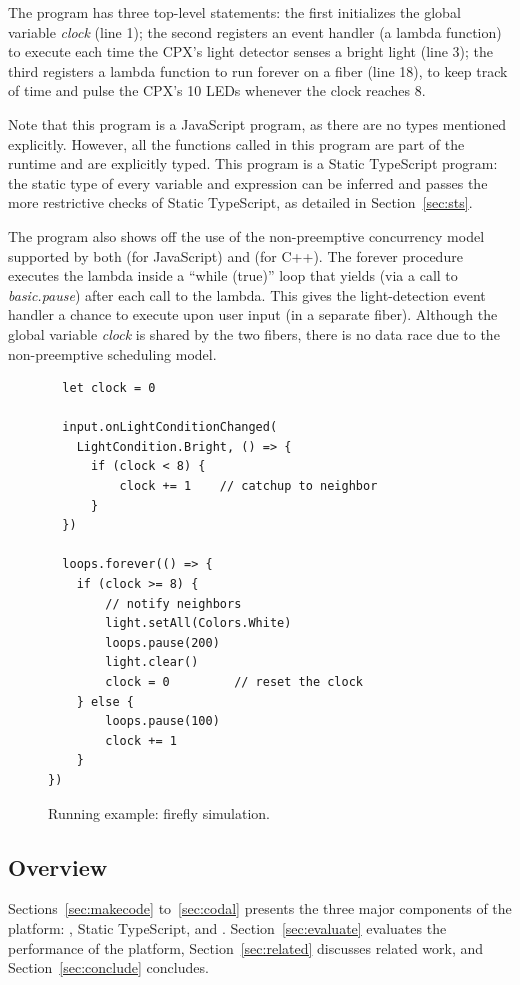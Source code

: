 The program has three top-level statements:
the first initializes the global variable \emph{clock} (line 1); the
second registers an event handler (a lambda function) to execute
each time the CPX's light detector senses a bright light (line 3); the
third registers a lambda function to run forever on a fiber (line 18),
to keep track of time and pulse the CPX's 10 LEDs whenever the
clock reaches 8.

Note that this program is a JavaScript program, as there are no
types mentioned explicitly. However, all the functions called in
this program are part of the runtime and are explicitly
typed. This program is a Static TypeScript program:
the static type of every variable and expression
can be inferred and passes the more restrictive checks
of Static TypeScript, as detailed in Section~\ref{sec:sts}.

The program also shows off the use of the non-preemptive concurrency
model supported by both \MC (for JavaScript) and \CO (for C++).
The forever procedure executes the lambda inside a ``while (true)''
loop that yields (via a call to \emph{basic.pause}) after each call to the lambda.
This gives the light-detection event handler a chance to execute
upon user input (in a separate fiber). Although the global variable \emph{clock} is
shared by the two fibers, there is no data race due to the non-preemptive
scheduling model.

\begin{figure}
\begin{lstlisting}
  let clock = 0

  input.onLightConditionChanged(
    LightCondition.Bright, () => {
      if (clock < 8) {
          clock += 1    // catchup to neighbor
      }
  })

  loops.forever(() => {
    if (clock >= 8) {
        // notify neighbors
        light.setAll(Colors.White)
        loops.pause(200)
        light.clear()
        clock = 0         // reset the clock
    } else {
        loops.pause(100)
        clock += 1
    }
})
\end{lstlisting}
\caption{\label{fig:example}Running example: firefly simulation.}
\end{figure}

\subsection{Overview}
Sections~\ref{sec:makecode} to~\ref{sec:codal} presents the three major components of the platform:
\MC, Static TypeScript, and \CO. Section~\ref{sec:evaluate} evaluates the performance of the platform,
Section~\ref{sec:related} discusses related work, and Section~\ref{sec:conclude}
concludes.